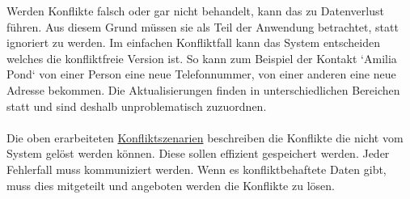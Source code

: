 Werden Konflikte falsch oder gar nicht behandelt, kann das zu Datenverlust führen.
Aus diesem Grund müssen sie als Teil der Anwendung betrachtet, statt ignoriert zu werden.
Im einfachen Konfliktfall kann das System entscheiden welches die konfliktfreie Version ist.
So kann zum Beispiel der Kontakt `Amilia Pond` von einer Person eine neue Telefonnummer, von einer anderen eine neue Adresse bekommen.
Die Aktualisierungen finden in unterschiedlichen Bereichen statt und sind deshalb unproblematisch zuzuordnen.\\\\
Die oben erarbeiteten \hyperref[chap:konfliktszenarien]{Konfliktszenarien} beschreiben die Konflikte die nicht vom System gelöst werden können.
Diese sollen effizient gespeichert werden.
Jeder Fehlerfall muss kommuniziert werden. Wenn es konfliktbehaftete Daten gibt, muss dies mitgeteilt und angeboten werden die Konflikte zu lösen.
